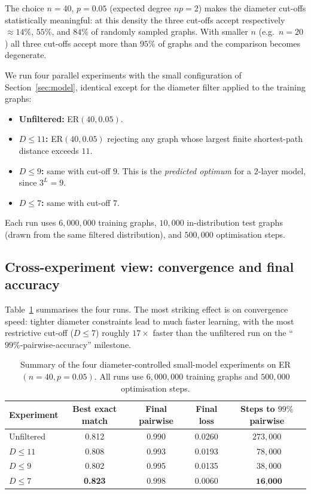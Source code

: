 \documentclass[11pt,a4paper]{article}
\begin{document}
The choice $n = 40$, $p = 0.05$ (expected degree $np = 2$) makes the
diameter cut-offs statistically meaningful: at this density the three
cut-offs accept respectively $\approx 14\%$, $55\%$, and $84\%$ of randomly
sampled graphs. With smaller $n$ (e.g.\ $n = 20$) all three cut-offs accept
more than $95\%$ of graphs and the comparison becomes degenerate.

We run four parallel experiments with the small configuration of
Section~\ref{sec:model}, identical except for the diameter filter applied
to the training graphs:
\begin{itemize}
    \item \textbf{Unfiltered:} ER$(40, 0.05)$.
    \item \textbf{$D \le 11$:} ER$(40, 0.05)$ rejecting any graph whose
          largest finite shortest-path distance exceeds $11$.
    \item \textbf{$D \le 9$:} same with cut-off $9$. This is the
          \emph{predicted optimum} for a $2$-layer model, since $3^L = 9$.
    \item \textbf{$D \le 7$:} same with cut-off $7$.
\end{itemize}
Each run uses $6{,}000{,}000$ training graphs, $10{,}000$ in-distribution
test graphs (drawn from the same filtered distribution), and $500{,}000$
optimisation steps.

\subsection{Cross-experiment view: convergence and final accuracy}
\label{sec:ch2-cross-in}

Table~\ref{tab:n40-summary} summarises the four runs. The most striking
effect is on convergence speed: tighter diameter constraints lead to
much faster learning, with the most restrictive cut-off ($D \le 7$)
roughly $17\times$ faster than the unfiltered run on the
``$99\%$-pairwise-accuracy'' milestone.

\begin{table}[H]
\centering
\begin{tabular}{lcccc}
\toprule
Experiment & Best exact match & Final pairwise & Final loss & Steps to $99\%$ pairwise \\
\midrule
Unfiltered   & 0.812 & 0.990 & 0.0260 & $273{,}000$ \\
$D \le 11$   & 0.808 & 0.993 & 0.0193 & $\phantom{0}78{,}000$ \\
$D \le 9$    & 0.802 & 0.995 & 0.0135 & $\phantom{0}38{,}000$ \\
$D \le 7$    & \textbf{0.823} & 0.998 & 0.0060 & $\phantom{0}\textbf{16{,}000}$ \\
\bottomrule
\end{tabular}
\caption{Summary of the four diameter-controlled small-model experiments
on ER$(n = 40, p = 0.05)$. All runs use $6{,}000{,}000$ training graphs
and $500{,}000$ optimisation steps.}
\label{tab:n40-summary}
\end{table}
\end{document}
